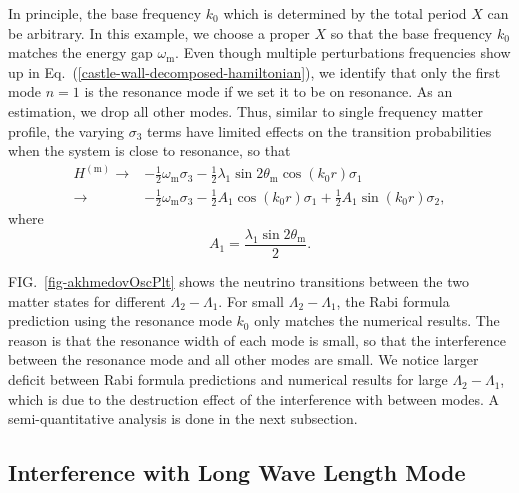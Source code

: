 \documentclass[%
reprint,
 amsmath,amssymb,
 aps,
]{revtex4-1}
\begin{document}
In principle, the base frequency $k_0$ which is determined by the total period $X$ can be arbitrary. In this example, we choose a proper $X$ so that the base frequency $k_0$ matches the energy gap $\omega_{\mathrm{m}}$. Even though multiple perturbations frequencies show up in Eq.~(\ref{castle-wall-decomposed-hamiltonian}), we identify that only the first mode $n=1$ is the resonance mode if we set it to be on resonance. As an estimation, we drop all other modes. Thus, similar to single frequency matter profile, the varying $\sigma_3$ terms have limited effects on the transition probabilities when the system is close to resonance, so that
\begin{align*}
    H^{(\mathrm m)} \to & - \frac{1}{2}\omega_{\mathrm m} \sigma_3  - \frac{1}{2} \lambda_1 \sin 2\theta_{\mathrm m}  \cos\left( k_0 r \right) \sigma_1\\
    \to & - \frac{1}{2}\omega_{\mathrm m} \sigma_3  - \frac{1}{2} A_1 \cos ( k_0 r) \sigma_1 + \frac{1}{2} A_1 \sin(k_0 r) \sigma_2,
\end{align*}
where
\begin{equation*}
A_1 = \frac{\lambda_1 \sin 2\theta_{\mathrm m} }{2} .
\end{equation*}


FIG.~\ref{fig-akhmedovOscPlt} shows the neutrino transitions between the two matter states for different $\Lambda_2-\Lambda_1$. For small $\Lambda_2-\Lambda_1$, the Rabi formula prediction using the resonance mode $k_0$ only matches the numerical results. The reason is that the resonance width of each mode is small, so that the interference between the resonance mode and all other modes are small. We notice larger deficit between Rabi formula predictions and numerical results for large $\Lambda_2-\Lambda_1$, which is due to the destruction effect of the interference with between modes. A semi-quantitative analysis is done in the next subsection.








\subsection{\label{sec:interference-with-long-wavelength-mode}Interference with Long Wave Length Mode}
\end{document}

